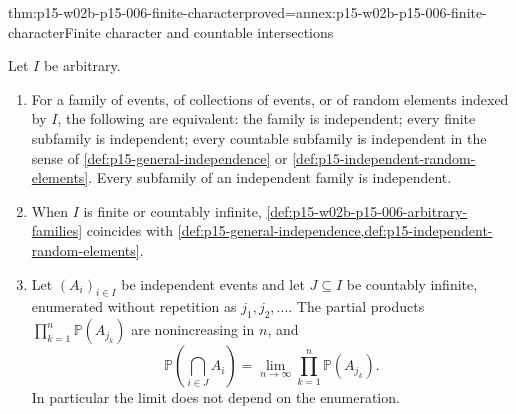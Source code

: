 \begin{hbtheorem}{thm:p15-w02b-p15-006-finite-character}{proved=annex:p15-w02b-p15-006-finite-character}{Finite character and countable intersections}
\par\nobreak
Let \(I\) be arbitrary.
\begin{enumerate}
\item For a family of events, of collections of events, or of random
      elements indexed by \(I\), the following are equivalent:
      the family is independent; every finite subfamily is independent;
      every countable subfamily is independent in the sense of
      \cref{def:p15-general-independence} or
      \cref{def:p15-independent-random-elements}. Every subfamily of an
      independent family is independent.
\item When \(I\) is finite or countably infinite,
      \cref{def:p15-w02b-p15-006-arbitrary-families} coincides with
      \cref{def:p15-general-independence,def:p15-independent-random-elements}.
\item Let \((A_i)_{i\in I}\) be independent events and let
      \(J\subseteq I\) be countably infinite, enumerated without
      repetition as \(j_1,j_2,\ldots\). The partial products
      \(\prod_{k=1}^n\mathbb P(A_{j_k})\) are nonincreasing in
      \(n\), and
      \[
       \mathbb P\left(\bigcap_{i\in J}A_i\right)
             =\lim_{n\to\infty}\prod_{k=1}^n\mathbb P(A_{j_k}).
      \]
      In particular the limit does not depend on the enumeration.
\end{enumerate}
\end{hbtheorem}

